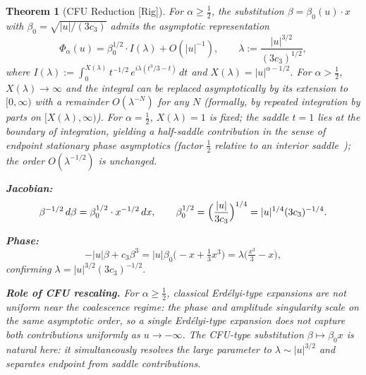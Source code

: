 \documentclass[12pt,a4paper]{amsart}
\newtheorem{theorem}{Theorem}[section]
\theoremstyle{definition}
\newcommand{\Rig}{\textup{[Rig]}}
\begin{document}
\begin{theorem}[CFU Reduction \Rig]
\label{thm:cfu}
For $\alpha\ge\tfrac{1}{2}$,
the substitution $\beta=\beta_0(u)\cdot x$
with $\beta_0=\sqrt{|u|/(3c_3)}$
admits the asymptotic representation
\begin{equation}\label{eq:cfu}
  \Phi_\alpha(u)
  = \beta_0^{1/2}\cdot I(\lambda)
  + O(|u|^{-1}),
  \qquad
  \lambda
  := \frac{|u|^{3/2}}{(3c_3)^{1/2}},
\end{equation}
where
$I(\lambda)
:= \int_0^{X(\lambda)}
t^{-1/2}\,e^{i\lambda(t^3/3-t)}\,dt$
and $X(\lambda)=|u|^{\alpha-1/2}$.
For $\alpha>\tfrac{1}{2}$, $X(\lambda)\to\infty$
and the integral can be replaced asymptotically
by its extension to $[0,\infty)$
with a remainder $O(\lambda^{-N})$ for any $N$
(formally, by repeated integration by parts
on $[X(\lambda),\infty)$).
For $\alpha=\tfrac{1}{2}$, $X(\lambda)=1$ is fixed;
the saddle $t=1$ lies at the boundary of integration,
yielding a half-saddle contribution
in the sense of endpoint stationary phase asymptotics
(factor $\tfrac{1}{2}$ relative to an interior saddle~\cite{Olver1974});
the order $O(\lambda^{-1/2})$ is unchanged.

\medskip
\noindent\textbf{Jacobian:}
\[
  \beta^{-1/2}\,d\beta
  = \beta_0^{1/2}\cdot x^{-1/2}\,dx,
  \qquad
  \beta_0^{1/2}
  = \Bigl(\frac{|u|}{3c_3}\Bigr)^{1/4}
  = |u|^{1/4}(3c_3)^{-1/4}.
\]

\medskip
\noindent\textbf{Phase:}
\[
  -|u|\beta+c_3\beta^3
  = |u|\beta_0\bigl(-x+\tfrac{1}{3}x^3\bigr)
  = \lambda\bigl(\tfrac{x^3}{3}-x\bigr),
\]
confirming $\lambda=|u|^{3/2}(3c_3)^{-1/2}$.

\medskip
\noindent\textbf{Role of CFU rescaling.}
For $\alpha\ge\tfrac{1}{2}$, classical Erd\'elyi-type expansions
are not uniform near the coalescence regime:
the phase and amplitude singularity scale on the same asymptotic
order, so a single Erd\'elyi-type expansion does not
capture both contributions uniformly as $u\to-\infty$.
The CFU-type substitution $\beta\mapsto\beta_0 x$ is natural here:
it simultaneously resolves the large parameter
to $\lambda\sim|u|^{3/2}$ and separates endpoint
from saddle contributions.


\end{theorem}
\end{document}
